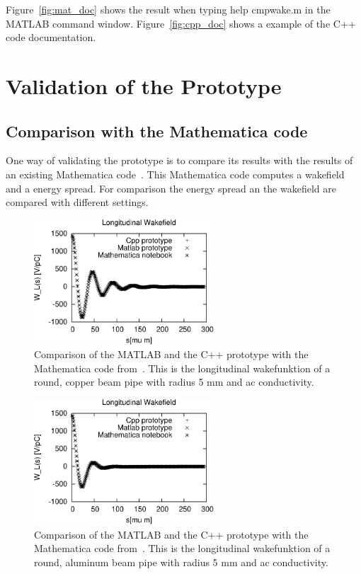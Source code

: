\documentclass[11pt,a4paper]{article}
\begin{document}
Figure~\ref{fig:mat_doc} shows the result when typing help cmpwake.m in the MATLAB command window. Figure~\ref{fig:cpp_doc} shows a example of the C++ code documentation.

\clearpage
\section{Validation of the Prototype}
\label{sec:Val_Prototype}
 \subsection{Comparison with the Mathematica code}
One way of validating the prototype is to compare its results with the results of an existing Mathematica code~\cite{notebook}. This Mathematica code computes a wakefield and a energy spread. For comparison the energy spread an the wakefield are compared with different settings.


\begin{figure}[htb]
\begin{center}
\includegraphics[width=0.6\textwidth]{wakeCompare/wake_Lo_Circ_Cu_AC_5.pdf}
\caption{Comparison of the MATLAB and the C++ prototype with the Mathematica code from~\cite{notebook}. This is the longitudinal wakefunktion of a round, copper beam pipe with radius 5 mm and ac conductivity. \label{fig:wave} }
\end{center}
\end{figure}
\begin{figure}[htb]
\begin{center}
\includegraphics[width=0.6\textwidth]{wakeCompare/wake_Lo_Circ_Al_AC_5.pdf}
\caption{Comparison of the MATLAB and the C++ prototype with the Mathematica code from~\cite{notebook}. This is the longitudinal wakefunktion of a round, aluminum beam pipe with radius 5 mm and ac conductivity. \label{fig:wave_Al} }
\end{center}
\end{figure}
\end{document}
